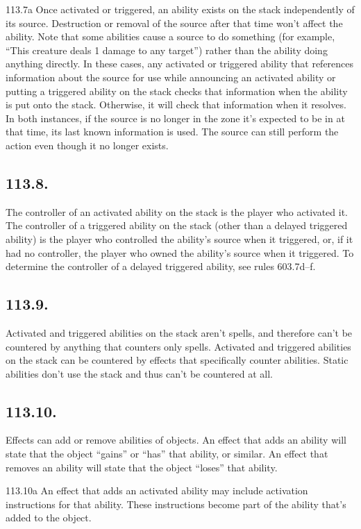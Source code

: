 113.7a Once activated or triggered, an ability exists on the stack independently of its source. Destruction or removal of the source after that time won’t affect the ability. Note that some abilities cause a source to do something (for example, “This creature deals 1 damage to any target”) rather than the ability doing anything directly. In these cases, any activated or triggered ability that references information about the source for use while announcing an activated ability or putting a triggered ability on the stack checks that information when the ability is put onto the stack. Otherwise, it will check that information when it resolves. In both instances, if the source is no longer in the zone it’s expected to be in at that time, its last known information is used. The source can still perform the action even though it no longer exists.

\subsection*{113.8.}
The controller of an activated ability on the stack is the player who activated it. The controller of a triggered ability on the stack (other than a delayed triggered ability) is the player who controlled the ability’s source when it triggered, or, if it had no controller, the player who owned the ability’s source when it triggered. To determine the controller of a delayed triggered ability, see rules 603.7d–f.

\subsection*{113.9.}
Activated and triggered abilities on the stack aren’t spells, and therefore can’t be countered by anything that counters only spells. Activated and triggered abilities on the stack can be countered by effects that specifically counter abilities. Static abilities don’t use the stack and thus can’t be countered at all.

\subsection*{113.10.}
Effects can add or remove abilities of objects. An effect that adds an ability will state that the object “gains” or “has” that ability, or similar. An effect that removes an ability will state that the object “loses” that ability.

113.10a An effect that adds an activated ability may include activation instructions for that ability. These instructions become part of the ability that’s added to the object.

